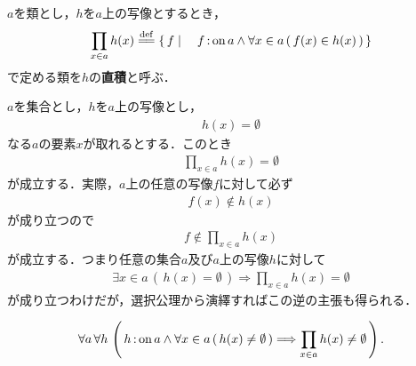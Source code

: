 	\begin{screen}
		\begin{dfn}[直積]
			$a$を類とし，$h$を$a$上の写像とするとき，
			\begin{align}
				\prod_{x \in a} h(x) \defeq
				\Set{f}{f \fon a \wedge \forall x \in a\, (\, f(x) \in h(x)\, )} 
			\end{align}
			で定める類を$h$の{\bf 直積}と呼ぶ．
		\end{dfn}
	\end{screen}
	
	$a$を集合とし，$h$を$a$上の写像とし，
	\begin{align}
		h(x) = \emptyset
	\end{align}
	なる$a$の要素$x$が取れるとする．このとき
	\begin{align}
		\prod_{x \in a} h(x) = \emptyset
	\end{align}
	が成立する．実際，$a$上の任意の写像$f$に対して必ず
	\begin{align}
		f(x) \notin h(x)
	\end{align}
	が成り立つので
	\begin{align}
		f \notin \prod_{x \in a} h(x)
	\end{align}
	が成立する．つまり任意の集合$a$及び$a$上の写像$h$に対して
	\begin{align}
		\exists x \in a\, (\, h(x) = \emptyset\, )
		\Longrightarrow \prod_{x \in a} h(x) = \emptyset
	\end{align}
	が成り立つわけだが，選択公理から演繹すればこの逆の主張も得られる．
	
	\begin{screen}
		\begin{thm}[空な値を取らない写像の直積は空でない]
		\label{thm:direct_product_of_non_empty_sets_is_not_empty}
			\begin{align}
			\forall a\, \forall h\, \left(\, h \operatorname*{:on} a \wedge \forall x \in a\, (\, h(x) \neq \emptyset\, )
				\Longrightarrow \prod_{x \in a} h(x) \neq \emptyset\, \right).
			\end{align}
		\end{thm}
	\end{screen}
	
